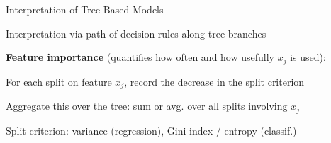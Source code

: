 \documentclass[10pt,compress,t,notes=noshow, xcolor=table]{beamer}
\begin{document}
\begin{framev}[align=top]{Interpretation of Tree-Based Models}
\begin{itemizeM}
\item Interpretation via path of decision rules along tree branches
\item \textbf{Feature importance} (quantifies how often and how usefully $x_j$ is used):
\begin{itemizeS}
\item For each split on feature $x_j$, record the decrease in the split criterion
\item Aggregate this over the tree: sum or avg. over all splits involving $x_j$
\item Split criterion: variance (regression), Gini index / entropy (classif.)
\end{itemizeS}
\end{itemizeM}
\end{framev}
\end{document}
